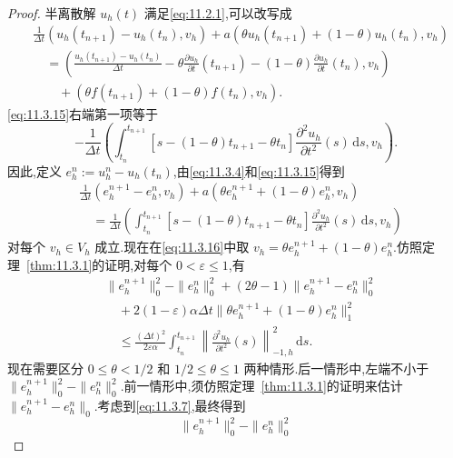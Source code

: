\begin{proof}
半离散解 \(u_h(t)\) 满足\eqref{eq:11.2.1},可以改写成
\begin{equation}\label{eq:11.3.15}
  \begin{aligned}
    &\frac1{\Delta t}(u_h(t_{n+1})-u_h(t_n),v_h)
      +a(\theta u_h(t_{n+1})+(1-\theta)u_h(t_n),v_h)\\
    &\quad=\left(\frac{u_h(t_{n+1})-u_h(t_n)}{\Delta t}
                 -\theta\frac{\partial u_h}{\partial t}(t_{n+1})
                 -(1-\theta)\frac{\partial u_h}{\partial t}(t_n),v_h\right)\\
    &\qquad+(\theta f(t_{n+1})+(1-\theta)f(t_n),v_h).
  \end{aligned}
\end{equation}
\eqref{eq:11.3.15}右端第一项等于
\[
  -\frac1{\Delta t}\left(
    \int_{t_n}^{t_{n+1}}[s-(1-\theta)t_{n+1}-\theta t_n]
         \frac{\partial^2u_h}{\partial t^2}(s)\,\mathrm ds,v_h\right).
\]
因此,定义 \(e_h^n:=u_h^n-u_h(t_n)\),由\eqref{eq:11.3.4}和\eqref{eq:11.3.15}得到
\begin{equation}\label{eq:11.3.16}
  \begin{aligned}
    &\frac1{\Delta t}(e_h^{n+1}-e_h^n,v_h)
        +a(\theta e_h^{n+1}+(1-\theta)e_h^n,v_h)\\
    &\quad=\frac1{\Delta t}\left(
      \int_{t_n}^{t_{n+1}}[s-(1-\theta)t_{n+1}-\theta t_n]
             \frac{\partial^2u_h}{\partial t^2}(s)\,\mathrm ds,v_h\right)
  \end{aligned}
\end{equation}
对每个 \(v_h\in V_h\) 成立.现在在\eqref{eq:11.3.16}中取 \(v_h=\theta e_h^{n+1}+(1-\theta)e_h^n\).仿照定理~\ref{thm:11.3.1}的证明,对每个 \(0<\varepsilon\le1\),有
\[
  \begin{aligned}
    &\|e_h^{n+1}\|_0^2-\|e_h^n\|_0^2+(2\theta-1)\|e_h^{n+1}-e_h^n\|_0^2\\
    &\quad+2(1-\varepsilon)\alpha\Delta t\|\theta e_h^{n+1}+(1-\theta)e_h^n\|_1^2\\
    &\quad\le\frac{(\Delta t)^2}{2\varepsilon\alpha}
            \int_{t_n}^{t_{n+1}}\left\|\frac{\partial^2u_h}{\partial t^2}(s)
                                      \right\|_{-1,h}^2\,\mathrm ds.
  \end{aligned}
\]
现在需要区分 \(0\le\theta<1/2\) 和 \(1/2\le\theta\le1\) 两种情形.后一情形中,左端不小于 \(\|e_h^{n+1}\|_0^2-\|e_h^n\|_0^2\).前一情形中,须仿照定理~\ref{thm:11.3.1}的证明来估计 \(\|e_h^{n+1}-e_h^n\|_0\).考虑到\eqref{eq:11.3.7},最终得到
\[
  \|e_h^{n+1}\|_0^2-\|e_h^n\|_0^2
\]
\end{proof}
